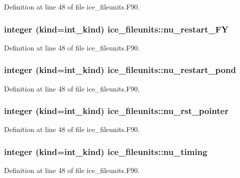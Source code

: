 Definition at line 48 of file ice\_\-fileunits.F90.\hypertarget{namespaceice__fileunits_af4ce2955d95671c93625715de173b82a}{
\subsubsection[{nu\_\-restart\_\-FY}]{\setlength{\rightskip}{0pt plus 5cm}integer (kind=int\_\-kind) {\bf ice\_\-fileunits::nu\_\-restart\_\-FY}}}
\label{namespaceice__fileunits_af4ce2955d95671c93625715de173b82a}


Definition at line 48 of file ice\_\-fileunits.F90.\hypertarget{namespaceice__fileunits_a9eb37e0f01221f9f3d7925da1c0838c0}{
\subsubsection[{nu\_\-restart\_\-pond}]{\setlength{\rightskip}{0pt plus 5cm}integer (kind=int\_\-kind) {\bf ice\_\-fileunits::nu\_\-restart\_\-pond}}}
\label{namespaceice__fileunits_a9eb37e0f01221f9f3d7925da1c0838c0}


Definition at line 48 of file ice\_\-fileunits.F90.\hypertarget{namespaceice__fileunits_aef0d982897260808734543575407020b}{
\subsubsection[{nu\_\-rst\_\-pointer}]{\setlength{\rightskip}{0pt plus 5cm}integer (kind=int\_\-kind) {\bf ice\_\-fileunits::nu\_\-rst\_\-pointer}}}
\label{namespaceice__fileunits_aef0d982897260808734543575407020b}


Definition at line 48 of file ice\_\-fileunits.F90.\hypertarget{namespaceice__fileunits_a4bd0122585694768cb4c57dd73954900}{
\subsubsection[{nu\_\-timing}]{\setlength{\rightskip}{0pt plus 5cm}integer (kind=int\_\-kind) {\bf ice\_\-fileunits::nu\_\-timing}}}
\label{namespaceice__fileunits_a4bd0122585694768cb4c57dd73954900}


Definition at line 48 of file ice\_\-fileunits.F90.